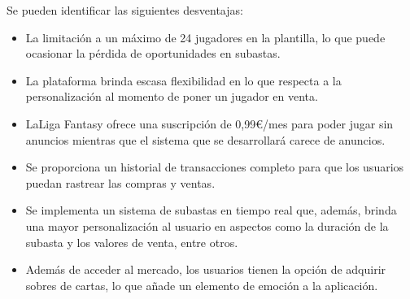 Se pueden identificar las siguientes desventajas:
\begin{itemize}
    \item La limitación a un máximo de 24 jugadores en la plantilla, lo que puede ocasionar la pérdida de oportunidades en subastas.
    \item La plataforma brinda escasa flexibilidad en lo que respecta a la personalización al momento de poner un jugador en venta.
\end{itemize}

\begin{itemize}
    \item LaLiga Fantasy ofrece una suscripción de 0,99€/mes para poder jugar sin anuncios mientras que el sistema que se desarrollará carece de anuncios.
    \item Se proporciona un historial de transacciones completo para que los usuarios puedan rastrear las compras y ventas.
    \item Se implementa un sistema de subastas en tiempo real que, además, brinda una mayor personalización al usuario en aspectos como la duración de la subasta y los valores de venta, entre otros.
    \item Además de acceder al mercado, los usuarios tienen la opción de adquirir sobres de cartas, lo que añade un elemento de emoción a la aplicación.
\end{itemize}


